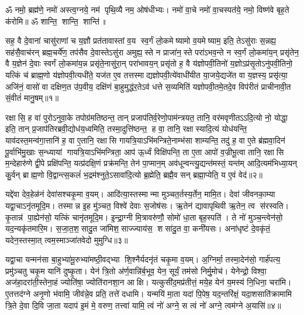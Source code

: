 
\setcounter{anuvakam}{0}
ॐ नमो॒ ब्रह्म॑णे॒ नमो॑ अस्त्व॒ग्नये॒ नम॑ पृथि॒व्यै नम॒ ओष॑धीभ्यः। नमो॑ वा॒चे नमो॑ वा॒चस्पत॑ये॒ नमो॒ विष्ण॑वे बृह॒ते क॑रोमि॥
ॐ शान्ति॒ शान्ति॒ शान्ति॑॥

सह॒ वै दे॒वानां चासु॑राणां च य॒ज्ञौ प्रत॑तावास्तां व॒य स्व॒र्गं लो॒कमेष्यामो व॒यमेष्याम॒ इति॒ तेऽसु॑राः स॒न्नह्य॒ सह॑सै॒वाच॑रन् ब्रह्म॒चर्ये॑ण॒ तप॑सैव दे॒वास्तेऽसु॑रा अमुह्य॒स्ते न प्राजा॑न॒स्ते परा॑ऽभव॒न्ते न स्व॒र्गं लो॒कमा॑य॒न् प्रसृ॑तेन॒ वै य॒ज्ञेन॑ दे॒वाः स्वर्गं लो॒कमा॑य॒न्न प्रसृ॑ते॒नासु॑रा॒न् परा॑भावय॒न् प्रसृ॑तो ह॒ वै य॑ज्ञोपवी॒तिनो॑ य॒ज्ञोऽप्र॑सृ॒तोऽनु॑पवी॒तिनो॒ यत्किं च॑ ब्राह्म॒णो य॑ज्ञोपवी॒त्यधी॑ते॒ यज॑त ए॒व तत्तस्माद्यज्ञोपवी॒त्ये॑वाधी॑यीत या॒जये॒द्यजे॑त वा य॒ज्ञस्य॒ प्रसृ॑त्या॒ अजि॑नं॒ वासो॑ वा दक्षिण॒त उ॑प॒वीय॒ दक्षि॑णं बा॒हुमुद्ध॑र॒तेऽव॑ धत्ते स॒व्यमिति॑ यज्ञोपवी॒तमे॒तदे॒व विप॑रीतं प्राचीनावी॒त सं॒वीतं॑ मानु॒षम्॥१॥\anuvakamend

रक्षासि॒ ह वा॑ पुरोऽनुवा॒के तपोग्र॑मतिष्ठन्त॒ तान् प्रजाप॑तिर्व॒रेणो॒पा\-म॑न्त्रयत॒ तानि॒ वर॑मवृणीतऽऽदि॒त्यो नो॒ योद्धा॒ इति॒ तान् प्र॒जाप॑तिरब्रवी॒द्योध॑य॒ध्वमिति॒ तस्मा॒दुत्ति॑ष्ठन्त॒ ह वा॒ तानि॒ रक्षास्यादि॒त्यं योध॑यन्ति॒ याव॑दस्त॒मन्व॑गा॒त्तानि॑ ह॒ वा ए॒तानि॒ रक्षासि गायत्रि॒याऽभि॑मन्त्रिते॒नाम्भ॑सा शाम्यन्ति॒ तदु॑ ह॒ वा ए॒ते ब्र॑ह्मवा॒दिन॑ पू॒र्वाभि॑मु॒खाः स॒न्ध्यायां गायत्रि॒याऽभि॑मन्त्रिता॒ आप॑ ऊ॒र्ध्वं विक्षि॑पन्ति॒ ता ए॒ता आपो॑ व॒ज्रीभू॒त्वा तानि॒ रक्षासि म॒न्देहारु॑णे द्वी॒पे प्रक्षि॑पन्ति॒ यत्प्र॑दक्षि॒णं प्रक्र॑मन्ति॒ तेन॑ पा॒प्मान॒म् अव॑धून्वन्त्यु॒द्यन्त॑मस्तं॒ यन्त॑म् आदि॒त्यम॑भिध्या॒यन् कु॒र्वन् ब्राह्म॒णो वि॒द्वान्त्स॒कलं॑ भ॒द्रम॑श्नुते॒ऽसावा॑दि॒त्यो ब्र॒ह्मेति॒ ब्रह्मै॒व सन् ब्रह्मा॒प्येति॒ य ए॒वं वेद॑॥२॥\anuvakamend

यद्दे॑वा देव॒हेळ॑नं देवा॑सश्चकृ॒मा व॒यम्। आदि॑त्या॒स्तस्मान्मा मुञ्चत॒र्तस्य॒र्तेन॒ मामि॒त। देवा॑ जीवनका॒म्या यद्वा॒चाऽनृ॑तमूदि॒म। तस्मान्न इ॒ह मु॑ञ्चत॒ विश्वे॑ देवाः स॒जोष॑सः। ऋ॒तेन॑ द्यावापृथिवी ऋ॒तेन॒ त्व स॑रस्वति। कृ॒तान्न॑ पा॒ह्येन॑सो॒ यत्किं चानृ॑तमूदि॒म। इ॒न्द्रा॒ग्नी मि॒त्रावरु॑णौ॒ सोमो॑ धा॒ता बृह॒स्पति॑। ते नो॑ मुञ्च॒न्त्वेन॑सो॒ यद॒न्यकृ॑तमारि॒म। स॒जा॒त॒श॒सादु॒त जा॑मिश॒साज्ज्याय॑स॒ शसा॑दु॒त वा॒ कनी॑यसः। अना॑धृष्टं दे॒वकृ॑तं॒ यदेन॒स्तस्मा॒त् त्वम॒स्माञ्जा॑तवेदो मुमुग्धि॥३॥

यद्वा॒चा यन्मन॑सा बा॒हुभ्या॑मू॒रुभ्या॑मष्ठी॒वद्भ्या शि॒श्नैर्यदनृ॑तं चकृ॒मा व॒यम्। अ॒ग्निर्मा॒ तस्मा॒देन॑सो॒ गार्\mbox{}ह॑पत्य॒ प्रमु॑ञ्चतु चकृ॒म यानि॑ दुष्कृ॒ता। येन॑ त्रि॒तो अ॑र्ण॒वान्नि॑र्ब॒भूव॒ येन॒ सूर्यं॒ तम॑सो निर्मु॒मोच॑। येनेन्द्रो॒ विश्वा॒ अज॑हा॒दरा॑ती॒स्तेना॒हं ज्योति॑षा॒ ज्योति॑रानशा॒न आक्षि। यत्कुसी॑द॒मप्र॑तीत्तं॒ मये॒ह येन॑ य॒मस्य॑ नि॒धिना॒ चरा॑मि। ए॒तत्तद॑ग्ने अनृ॒णो भ॑वामि॒ जीव॑न्ने॒व प्रति॒ तत्ते॑ दधामि। यन्मयि॑ मा॒ता यदा॑ पि॒पेष॒ यद॒न्तरि॑क्षं॒ यदा॒शसाति॑क्रामामि त्रि॒ते दे॒वा दि॒वि जा॒ता यदाप॑ इ॒मं मे॒ वरुण॒ तत्त्वा॑ यामि॒ त्वं नो॑ अग्ने॒ स त्वं नो॑ अग्ने॒ त्वम॑ग्ने अ॒यासि॑॥४॥\anuvakamend

